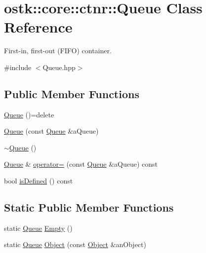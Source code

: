 \hypertarget{classostk_1_1core_1_1ctnr_1_1_queue}{}\section{ostk\+:\+:core\+:\+:ctnr\+:\+:Queue Class Reference}
\label{classostk_1_1core_1_1ctnr_1_1_queue}


First-\/in, first-\/out (F\+I\+FO) container.  




{\ttfamily \#include $<$Queue.\+hpp$>$}

\subsection*{Public Member Functions}
\begin{DoxyCompactItemize}
\item 
\hyperlink{classostk_1_1core_1_1ctnr_1_1_queue_ad64a554616db74739cb15e9ac9e15cff}{Queue} ()=delete
\item 
\hyperlink{classostk_1_1core_1_1ctnr_1_1_queue_aa502e0316077867910ecb429fe7c0ece}{Queue} (const \hyperlink{classostk_1_1core_1_1ctnr_1_1_queue}{Queue} \&a\+Queue)
\item 
\hyperlink{classostk_1_1core_1_1ctnr_1_1_queue_aa32f7638fb2ec6ed005a2c1ee34b9a9a}{$\sim$\+Queue} ()
\item 
\hyperlink{classostk_1_1core_1_1ctnr_1_1_queue}{Queue} \& \hyperlink{classostk_1_1core_1_1ctnr_1_1_queue_aee4d2cbf17305178a7bf4e44704c487e}{operator=} (const \hyperlink{classostk_1_1core_1_1ctnr_1_1_queue}{Queue} \&a\+Queue) const
\item 
bool \hyperlink{classostk_1_1core_1_1ctnr_1_1_queue_a1dcc6d565db96c3bbcb79bf0f1db48ce}{is\+Defined} () const
\end{DoxyCompactItemize}
\subsection*{Static Public Member Functions}
\begin{DoxyCompactItemize}
\item 
static \hyperlink{classostk_1_1core_1_1ctnr_1_1_queue}{Queue} \hyperlink{classostk_1_1core_1_1ctnr_1_1_queue_a0b8fbff685d8be67bac3f5a71e181d23}{Empty} ()
\item 
static \hyperlink{classostk_1_1core_1_1ctnr_1_1_queue}{Queue} \hyperlink{classostk_1_1core_1_1ctnr_1_1_queue_a4d733e2e9c7153a094f025fc6fa0a68b}{Object} (const \hyperlink{classostk_1_1core_1_1ctnr_1_1_object}{Object} \&an\+Object)
\end{DoxyCompactItemize}
